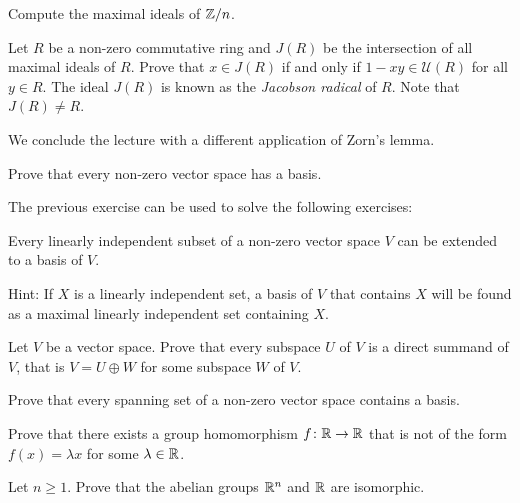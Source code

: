 \begin{exercise}
	Compute the maximal ideals of $\mathbb{Z}/n$. 	
\end{exercise}

\begin{exercise}
\label{xca:Jacobson}
	Let $R$ be a non-zero commutative ring and $J(R)$ be the intersection of all maximal ideals 
	of $R$. Prove that $x\in J(R)$ 
	if and only if $1-xy\in\mathcal{U}(R)$ for all $y\in R$. The ideal $J(R)$ is known
	as the \emph{Jacobson radical} of $R$. Note that $J(R)\ne R$.   
\end{exercise}

We conclude the lecture with a different application of Zorn's lemma.  

\begin{bonus}
	Prove that every non-zero vector space has a basis.
\end{bonus}

The previous exercise can be used to solve the following exercises:

\begin{bonus}
\label{xca:extend}
    Every linearly independent subset of a non-zero vector space
    $V$ can be extended to a basis of $V$.
\end{bonus} 

Hint: If $X$ is a linearly independent set, a basis 
of $V$ that contains $X$ will be found as a maximal linearly independent set 
containing $X$. 

\begin{bonus}
    Let $V$ be a vector space. Prove that every subspace $U$ of $V$ is a direct summand of $V$, that is
    $V=U\oplus W$ for some subspace $W$ of $V$. 
\end{bonus}

\begin{bonus}
    Prove that every spanning set of a non-zero vector space
    contains a basis. 
\end{bonus}

\begin{bonus}
\label{xca:fx=cx}
    Prove that there exists a group homomorphism $f\colon\mathbb{R}\to\mathbb{R}$ that 
    is not of the form $f(x)=\lambda x$ for some $\lambda\in\mathbb{R}$. 
\end{bonus}


\begin{bonus}
\label{xca:Rn=R}
    Let $n\geq1$. Prove that the abelian groups $\mathbb{R}^n$ and $\mathbb{R}$ are isomorphic.
\end{bonus}


